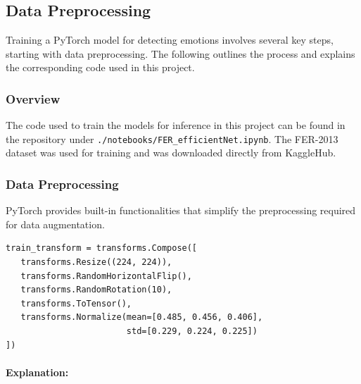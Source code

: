 \documentclass{article}
\begin{document}
\subsection*{Data Preprocessing}

Training a PyTorch model for detecting emotions involves several key steps, starting with data preprocessing. The following outlines the process and explains the corresponding code used in this project.

\subsubsection*{Overview}

The code used to train the models for inference in this project can be found in the repository under \texttt{./notebooks/FER\_efficientNet.ipynb}. The FER-2013 dataset was used for training and was downloaded directly from KaggleHub.

\subsubsection*{Data Preprocessing}

PyTorch provides built-in functionalities that simplify the preprocessing required for data augmentation.

\begin{verbatim}
train_transform = transforms.Compose([
   transforms.Resize((224, 224)),
   transforms.RandomHorizontalFlip(),
   transforms.RandomRotation(10),
   transforms.ToTensor(),
   transforms.Normalize(mean=[0.485, 0.456, 0.406],
                        std=[0.229, 0.224, 0.225])
])
\end{verbatim}

\paragraph{Explanation:}
\end{document}
